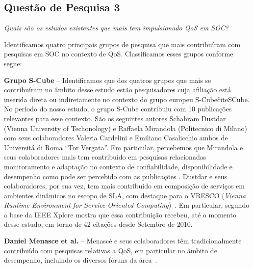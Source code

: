\subsection{Questão de Pesquisa 3}

\emph{Quais s\~{a}o os estudos existentes que mais tem impulsionado QoS em SOC?}


Identificamos quatro principais grupos de pesquisa que mais contribu\'{i}ram com pesquisas em SOC no contexto de QoS. Classificamos esses grupos conforme segue: 

\textbf{Grupo S-Cube} -- Identificamos que dos quatros grupos que mais se contribu\'{i}ram no \^{a}mbito desse estudo est\~{a}o pesquisadores cuja afilia\c{c}\~{a}o est\'{a} inserida direta ou indiretamente no contexto do grupo europeu S-Cube\~cite{SCube}. No per\'{i}odo do nosso estudo, o grupo S-Cube contribuiu com 10 publica\c{c}\~{o}es relevantes para esse contexto. S\~{a}o os seguintes autores Schahram Dustdar (Vienna University of Techonology) e Raffaela Mirandola (Politecnico di Milano) com seus colaboradores Valeria Cardelini e Emiliano Casalicchio ambos de Universit\'{a} di Roma ``Tor Vergata''. Em particular, percebemos que Mirandola e seus colaboradores mais tem contribu\'{i}do em pesquisas relacionadas monitoramento e adapta\c{c}\~{a}o no contexto de confiabilidade, disponibilidade e desempenho como pode ser percebido com as publica\c{c}\~{o}es \cite{Cardellini:2009:QRA:1595696.1595718, Calinescu:2011:DQM:1990772.1991012, Ardagna:2010:POS:1814581.1814611, 10.1109/TSE.2011.68, Cardellini:2009:TSD:1692867.1692870}. Dustdar e seus colaboradores, por sua vez, tem mais contribu\'{i}do em composi\c{c}\~{a}o de servi\c{c}os em ambientes din\^{a}micos no escopo de SLA, com destaque para o  VRESCO (\emph{Vienna Runtime Environment for Service-Oriented Computing})~\cite{5467022}. Em particular, segundo a base da IEEE Xplore mostra que essa contribui\c{c}\~{a}o recebeu, at\'{e} o momento desse estudo, em torno de 42 cita\c{c}\~{o}es desde Setembro de 2010.

\textbf{Daniel Menasce et al.} -- Menasc\'{e} e seus colaboradores t\^{e}m tradicionalmente contribu\'{i}do com pesquisas relativas a QoS, em particular no \^{a}mbito de desempenho, incluindo os diversos f\'{o}runs da \'{a}rea~\cite{DBLP:journals/internet/Menasce04b, DBLP:journals/pe/MenasceARRFM03, DBLP:journals/tse/MenasceG00, Menasce:2001:CPW:560806}. 

